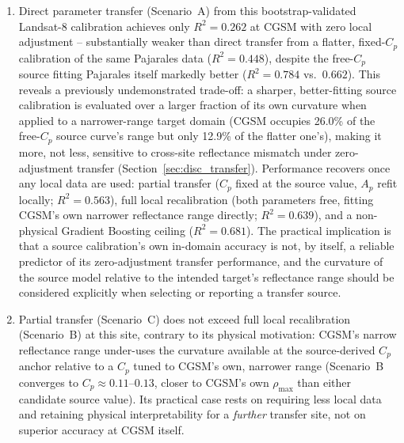 \documentclass[remotesensing,article,submit,pdftex,moreauthors]{Definitions/mdpi}
\begin{document}
\begin{enumerate}
    \item Direct parameter transfer (Scenario~A) from this
    bootstrap-validated Landsat-8 calibration achieves only
    $R^2 = 0.262$ at CGSM with zero local adjustment -- substantially
    weaker than direct transfer from a flatter, fixed-$C_p$ calibration
    of the same Pajarales data ($R^2 = 0.448$), despite the free-$C_p$
    source fitting Pajarales itself markedly better
    ($R^2 = 0.784$ vs.\ $0.662$). This reveals a previously
    undemonstrated trade-off: a sharper, better-fitting source
    calibration is evaluated over a larger fraction of its own
    curvature when applied to a narrower-range target domain (CGSM
    occupies 26.0\% of the free-$C_p$ source curve's range but only
    12.9\% of the flatter one's), making it more, not less, sensitive
    to cross-site reflectance mismatch under zero-adjustment transfer
    (Section~\ref{sec:disc_transfer}). Performance recovers once any
    local data are used: partial transfer ($C_p$ fixed at the source
    value, $A_p$ refit locally; $R^2 = 0.563$), full local
    recalibration (both parameters free, fitting CGSM's own narrower
    reflectance range directly; $R^2 = 0.639$), and a non-physical
    Gradient Boosting ceiling ($R^2 = 0.681$). The practical
    implication is that a source calibration's own in-domain accuracy
    is not, by itself, a reliable predictor of its zero-adjustment
    transfer performance, and the curvature of the source model
    relative to the intended target's reflectance range should be
    considered explicitly when selecting or reporting a transfer
    source.
 
    \item Partial transfer (Scenario~C) does not exceed full local
    recalibration (Scenario~B) at this site, contrary to its physical
    motivation: CGSM's narrow reflectance range under-uses the
    curvature available at the source-derived $C_p$ anchor relative to
    a $C_p$ tuned to CGSM's own, narrower range (Scenario~B converges
    to $C_p \approx 0.11$--$0.13$, closer to CGSM's own $\rho_{\max}$
    than either candidate source value). Its practical case rests on
    requiring less local data and retaining physical interpretability
    for a \emph{further} transfer site, not on superior accuracy at
    CGSM itself.
 

\end{enumerate}
\end{document}

